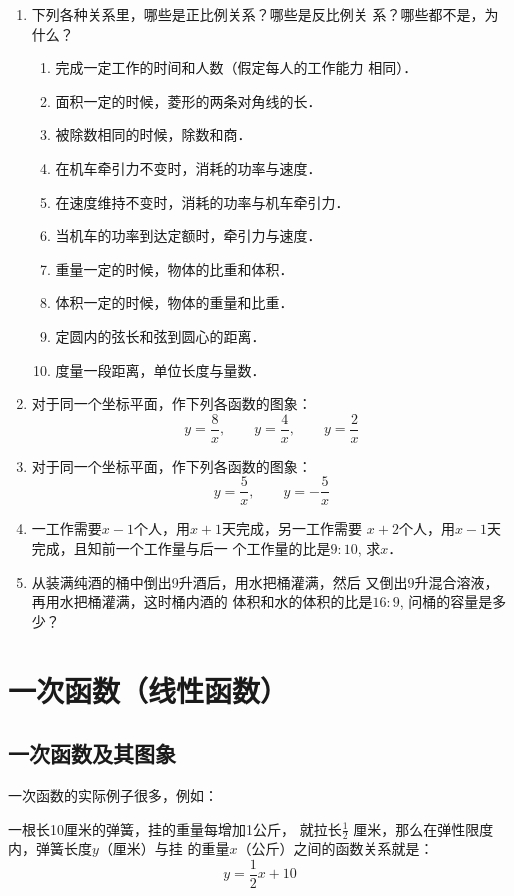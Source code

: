 \begin{ex}
\begin{enumerate}
    \item 下列各种关系里，哪些是正比例关系？哪些是反比例关
    系？哪些都不是，为什么？
    \begin{enumerate}
    \item 完成一定工作的时间和人数（假定每人的工作能力
    相同）．
    \item 面积一定的时候，菱形的两条对角线的长．
    \item 被除数相同的时候，除数和商．
    \item 在机车牵引力不变时，消耗的功率与速度．
    \item 在速度维持不变时，消耗的功率与机车牵引力．
    \item 当机车的功率到达定额时，牵引力与速度．
    \item 重量一定的时候，物体的比重和体积．
    \item 体积一定的时候，物体的重量和比重．
    \item 定圆内的弦长和弦到圆心的距离．
    \item 度量一段距离，单位长度与量数．        
    \end{enumerate}

    \item 对于同一个坐标平面，作下列各函数的图象：
    \[y=\frac{8}{x},\qquad y=\frac{4}{x},\qquad y=\frac{2}{x}\]
    \item  对于同一个坐标平面，作下列各函数的图象：
    \[y=\frac{5}{x},\qquad y=-\frac{5}{x}\]
    \item 一工作需要$x-1$个人，用$x+1$天完成，另一工作需要
    $x+2$个人，用$x-1$天完成，且知前一个工作量与后一
    个工作量的比是$9:10$, 求$x$．
\item 从装满纯酒的桶中倒出9升酒后，用水把桶灌满，然后
又倒出9升混合溶液，再用水把桶灌满，这时桶内酒的
体积和水的体积的比是$16:9$, 问桶的容量是多少？
\end{enumerate}
\end{ex}

\section{一次函数（线性函数）}
\subsection{一次函数及其图象}
一次函数的实际例子很多，例如：


\begin{example}
一根长10厘米的弹簧，挂的重量每增加1公斤，
就拉长$\frac{1}{2}$
厘米，那么在弹性限度内，弹簧长度$y$（厘米）与挂
的重量$x$（公斤）之间的函数关系就是：
\begin{equation}
    y=\frac{1}{2}x+10
\end{equation}
\end{example}


